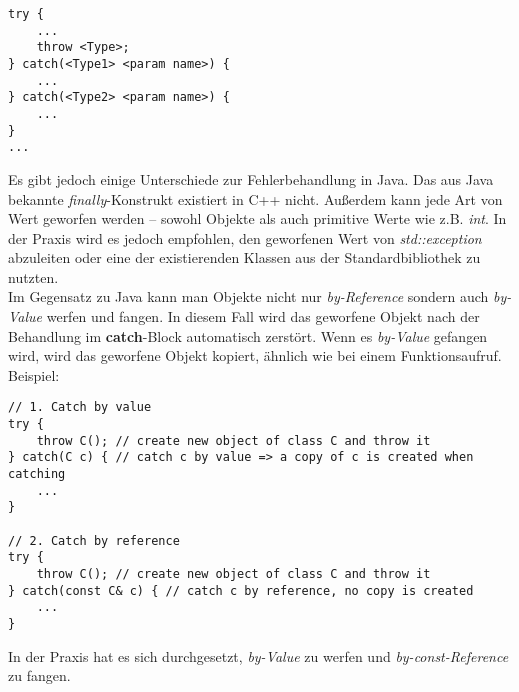\begin{lstlisting}
try {
	...
	throw <Type>;
} catch(<Type1> <param name>) {
	...
} catch(<Type2> <param name>) {
	...
}
...
\end{lstlisting} 

Es gibt jedoch einige Unterschiede zur Fehlerbehandlung in Java.
Das aus Java bekannte \emph{finally}-Konstrukt existiert in C++ nicht.
Außerdem kann jede Art von Wert geworfen werden -- sowohl Objekte als auch primitive Werte wie z.B. \emph{int}.
In der Praxis wird es jedoch empfohlen, den geworfenen Wert von \emph{std::exception} abzuleiten oder eine der existierenden Klassen aus der Standardbibliothek zu nutzten. \\

Im Gegensatz zu Java kann man Objekte nicht nur \emph{by-Reference} sondern auch \emph{by-Value} werfen und fangen. In diesem Fall wird das geworfene Objekt nach der Behandlung im \textbf{catch}-Block automatisch zerstört. Wenn es \emph{by-Value} gefangen wird, wird das geworfene Objekt kopiert, ähnlich wie bei einem Funktionsaufruf. Beispiel:

\begin{lstlisting}
// 1. Catch by value
try {
	throw C(); // create new object of class C and throw it 
} catch(C c) { // catch c by value => a copy of c is created when catching
	...
}

// 2. Catch by reference
try {
	throw C(); // create new object of class C and throw it 
} catch(const C& c) { // catch c by reference, no copy is created
	...
}
\end{lstlisting} 

In der Praxis hat es sich durchgesetzt, \emph{by-Value} zu werfen und \emph{by-const-Reference} zu fangen.


